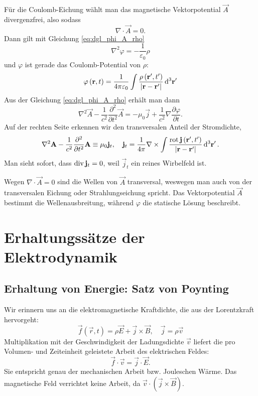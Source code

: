 Für die Coulomb-Eichung wählt man das magnetische Vektorpotential $\vec {A}$ divergenzfrei, also sodass
\begin{equation*}
	\nabla \cdot \vec {A}=0.
\end{equation*}
Dann gilt mit Gleichung \eqref{eq:dgl_phi_A_rho}
\begin{equation*}
	\nabla ^{2}\varphi =-\frac{1}{\varepsilon _{0}}\rho
\end{equation*}
und $\varphi $ ist gerade das Coulomb-Potential von $\rho $:
\begin{equation*}
	\varphi \left(\vec {r},t\right)=\frac{1}{4\pi \varepsilon _{0}}\int \frac{\rho \left(\vec {r}',t'\right)}{\left| \vec {r}-\vec {r}'\right| }\diffa[3]{\vec{r}'}
\end{equation*}
Aus der Gleichung \eqref{eq:dgl_phi_A_rho} erhält man dann
\begin{equation*}
	\nabla ^{2}\vec {A}-\frac{1}{c^{2}}\frac{\partial ^{2}}{\partial t^{2}}\vec {A}=-\mu _{0}\vec {j}+\frac{1}{c^{2}}\nabla \frac{\partial \varphi }{\partial t}.
\end{equation*}
Auf der rechten Seite erkennen wir den transversalen Anteil der Stromdichte,
\begin{equation*}
	\nabla ^{2}\vec {A}-\frac{1}{c^{2}}\frac{\partial ^{2}}{\partial t^{2}}\vec {A}\equiv\mu _{0}\vec {j}_{t},\quad \vec {j}_{t}=\frac{1}{4\pi }\nabla \times \int \frac{\rot \vec {j}\left(\vec {r}',t'\right)}{\left| \vec {r}-\vec {r}'\right| }\diffa[3]{\vec{r}'}.
\end{equation*}
Man sieht sofort, dass $\divg \vec {j}_{t}=0$, weil $\vec {j}_{t}$ ein reines Wirbelfeld ist.

Wegen $\nabla \cdot \vec {A}=0$ sind die Wellen von $\vec {A}$ transversal, weswegen man auch von der transversalen Eichung oder Strahlungseichung spricht. Das Vektorpotential $\vec {A}$ bestimmt die Wellenausbreitung, während $\varphi $ die statische Lösung beschreibt.

\section{Erhaltungssätze der Elektrodynamik}

\subsection{Erhaltung von Energie: Satz von Poynting}

Wir erinnern uns an die elektromagnetische Kraftdichte, die aus der Lorentzkraft hervorgeht:
\begin{equation*}
	\vec {f}\left(\vec {r},t\right)=\rho \vec {E}+\vec {j}\times \vec {B},\quad \vec {j}=\rho \vec {v}
\end{equation*}
Multiplikation mit der Geschwindigkeit der Ladungsdichte $\vec {v}$ liefert die pro Volumen- und Zeiteinheit geleistete Arbeit des elektrischen Feldes:
\begin{equation*}
	\vec {f}\cdot \vec {v}=\vec {j}\cdot \vec {E}.
\end{equation*}
Sie entspricht genau der mechanischen Arbeit bzw. Jouleschen Wärme. Das magnetische Feld verrichtet keine Arbeit, da $\vec {v}\cdot \left(\vec {j}\times \vec {B}\right)$.

